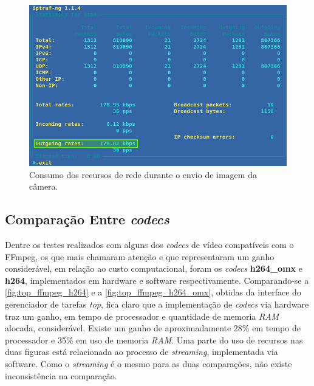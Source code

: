 \begin{figure}[H]
	\centering
	\includegraphics[width=1\textwidth]{figuras/consumo_banda_camera.png}
	\caption{Consumo dos recursos de rede durante o envio de imagem da câmera.}
	\label{fig:consumo_banda_video}
\end{figure}

\subsection{Comparação Entre \textit{codecs}}
\label{subsec:compcodecs}

Dentre os testes realizados com alguns dos \textit{codecs} de vídeo compatíveis com o FFmpeg, os que mais chamaram atenção e que representaram um ganho considerável, em relação ao custo computacional, foram os \textit{codecs} \textbf{h264\_omx} e \textbf{h264}, implementados em hardware e software respectivamente.
Comparando-se a \autoref{fig:top_ffmpeg_h264} e a \autoref{fig:top_ffmpeg_h264_omx}, obtidas da interface do gerenciador de tarefas \textit{top}, fica claro que a implementação de \textit{codecs} via hardware traz um ganho, em tempo de processador e quantidade de memoria \textit{RAM} alocada, considerável. Existe um ganho de aproximadamente 28\% em tempo de processador e 35\% em uso de memoria \textit{RAM}. Uma parte do uso de recursos nas duas figuras está relacionada ao processo de \textit{streaming}, implementada via software. Como o \textit{streaming} é o mesmo para as duas comparações, não existe inconsistência na comparação.

